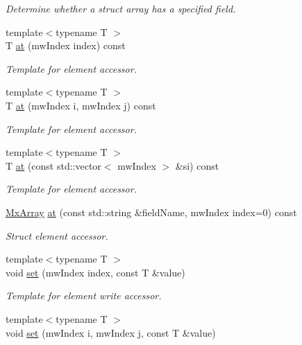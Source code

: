 \begin{DoxyCompactItemize}
\begin{DoxyCompactList}\small\item\em \-Determine whether a struct array has a specified field. \end{DoxyCompactList}\item 
{\footnotesize template$<$typename T $>$ }\\\-T \hyperlink{class_mx_array_a7c5608847d4feeae2ecdeafb8497935e}{at} (mw\-Index index) const 
\begin{DoxyCompactList}\small\item\em \-Template for element accessor. \end{DoxyCompactList}\item 
{\footnotesize template$<$typename T $>$ }\\\-T \hyperlink{class_mx_array_a5bdc668cca9f2d1ac892ebe7b70ba7bf}{at} (mw\-Index i, mw\-Index j) const 
\begin{DoxyCompactList}\small\item\em \-Template for element accessor. \end{DoxyCompactList}\item 
{\footnotesize template$<$typename T $>$ }\\\-T \hyperlink{class_mx_array_a4a08ca330eddd1d7529fa7e52787c13b}{at} (const std\-::vector$<$ mw\-Index $>$ \&si) const 
\begin{DoxyCompactList}\small\item\em \-Template for element accessor. \end{DoxyCompactList}\item 
\hyperlink{class_mx_array}{\-Mx\-Array} \hyperlink{class_mx_array_ab0bd69bb02dceceb08e9aa0d370f67e3}{at} (const std\-::string \&field\-Name, mw\-Index index=0) const 
\begin{DoxyCompactList}\small\item\em \-Struct element accessor. \end{DoxyCompactList}\item 
{\footnotesize template$<$typename T $>$ }\\void \hyperlink{class_mx_array_ac074890c7e291d058a42d277484b474d}{set} (mw\-Index index, const \-T \&value)
\begin{DoxyCompactList}\small\item\em \-Template for element write accessor. \end{DoxyCompactList}\item 
{\footnotesize template$<$typename T $>$ }\\void \hyperlink{class_mx_array_a273d34df890744e5bd647b683b115156}{set} (mw\-Index i, mw\-Index j, const \-T \&value)

\end{DoxyCompactItemize}
